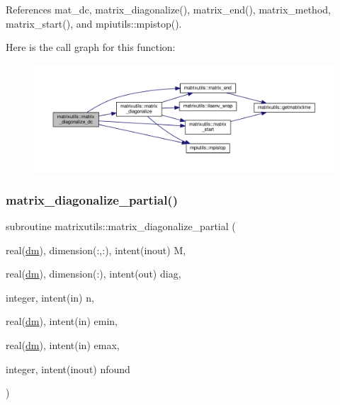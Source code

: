 References mat\+\_\+dc, matrix\+\_\+diagonalize(), matrix\+\_\+end(), matrix\+\_\+method, matrix\+\_\+start(), and mpiutils\+::mpistop().

Here is the call graph for this function\+:
\nopagebreak
\begin{figure}[H]
\begin{center}
\leavevmode
\includegraphics[width=350pt]{namespacematrixutils_a03b181040e90fb7d7693f10d0716a04f_cgraph}
\end{center}
\end{figure}
\mbox{\label{namespacematrixutils_a1f7b4399f422b8532d242374454b9e03}} 
\subsubsection{\texorpdfstring{matrix\+\_\+diagonalize\+\_\+partial()}{matrix\_diagonalize\_partial()}}
{\footnotesize\ttfamily subroutine matrixutils\+::matrix\+\_\+diagonalize\+\_\+partial (\begin{DoxyParamCaption}\item[{real(\mbox{\hyperlink{namespacematrixutils_a7bdc564986ea4d90f51201c75606ef3d}{dm}}), dimension(\+:,\+:), intent(inout)}]{M,  }\item[{real(\mbox{\hyperlink{namespacematrixutils_a7bdc564986ea4d90f51201c75606ef3d}{dm}}), dimension(\+:), intent(out)}]{diag,  }\item[{integer, intent(in)}]{n,  }\item[{real(\mbox{\hyperlink{namespacematrixutils_a7bdc564986ea4d90f51201c75606ef3d}{dm}}), intent(in)}]{emin,  }\item[{real(\mbox{\hyperlink{namespacematrixutils_a7bdc564986ea4d90f51201c75606ef3d}{dm}}), intent(in)}]{emax,  }\item[{integer, intent(inout)}]{nfound }\end{DoxyParamCaption})}



